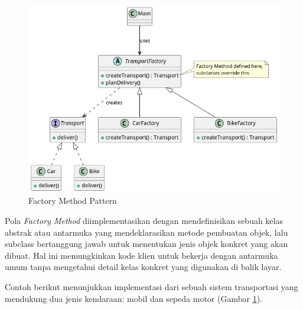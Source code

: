 \begin{figure}[h]
	\centering
	\includegraphics[width=.9\textwidth]{../figures/out/factory_method.png}
	\caption{Factory Method Pattern}
	\label{fig:factory-method}
\end{figure}


Pola \textit{Factory Method} diimplementasikan dengan mendefinisikan sebuah kelas abstrak atau antarmuka yang mendeklarasikan metode pembuatan objek, lalu subclass bertanggung jawab untuk menentukan jenis objek konkret yang akan dibuat. Hal ini memungkinkan kode klien untuk bekerja dengan antarmuka umum tanpa mengetahui detail kelas konkret yang digunakan di balik layar.

Contoh berikut menunjukkan implementasi dari sebuah sistem transportasi yang mendukung dua jenis kendaraan: mobil dan sepeda motor (Gambar \ref{fig:factory-method}).

